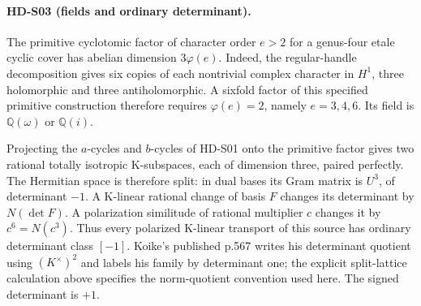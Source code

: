 \paragraph{HD-S03 (fields and ordinary determinant).}
The primitive cyclotomic factor of character order \(e>2\) for a
genus-four etale cyclic cover has abelian dimension \(3\varphi(e)\).
Indeed, the regular-handle decomposition gives six copies of each
nontrivial complex character in \(H^1\), three holomorphic and three
antiholomorphic. A sixfold factor of this specified primitive construction
therefore requires \(\varphi(e)=2\), namely \(e=3,4,6\).
Its field is \(\mathbb Q(\omega)\) or \(\mathbb Q(i)\).

Projecting the \(a\)-cycles and \(b\)-cycles of HD-S01 onto the primitive
factor gives two rational totally isotropic K-subspaces, each of dimension
three, paired perfectly. The Hermitian space is therefore split:
in dual bases its Gram matrix is \(U^3\), of determinant \(-1\).
A K-linear rational change of basis \(F\) changes its determinant by
\(N(\det F)\). A polarization similitude of rational multiplier \(c\)
changes it by \(c^6=N(c^3)\). Thus every polarized K-linear transport
of this source has ordinary determinant class \([-1]\).
Koike's published p.567 writes his determinant quotient using
\((K^\times)^2\) and labels his family by determinant one; the
explicit split-lattice calculation above specifies the norm-quotient
convention used here. The signed determinant is \(+1\).

